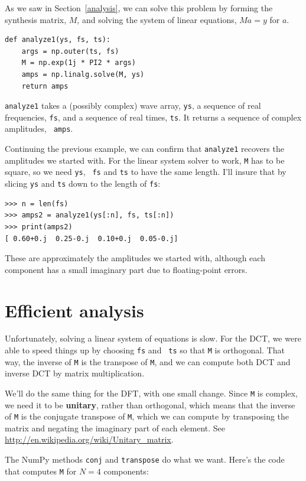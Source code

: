 \documentclass[12pt]{book}
\begin{document}
As we saw in Section~\ref{analysis}, we can solve this problem by forming
the synthesis matrix, $M$, and solving the system of linear
equations, $M a = y$ for $a$.

\begin{verbatim}
def analyze1(ys, fs, ts):
    args = np.outer(ts, fs)
    M = np.exp(1j * PI2 * args)
    amps = np.linalg.solve(M, ys)
    return amps
\end{verbatim}

{\tt analyze1} takes a (possibly complex) wave array, {\tt ys}, a
sequence of real frequencies, {\tt fs}, and a sequence of real
times, {\tt ts}.  It returns a sequence of complex amplitudes, {\tt
  amps}.

Continuing the previous example, we can confirm that {\tt analyze1}
recovers the amplitudes we started with.  For the linear system
solver to work, {\tt M} has to be square, so we need {\tt ys}, {\tt
  fs} and {\tt ts} to have the same length.  I'll insure that by
slicing {\tt ys} and {\tt ts} down to the length of {\tt fs}:

\begin{verbatim}
>>> n = len(fs)
>>> amps2 = analyze1(ys[:n], fs, ts[:n])
>>> print(amps2)
[ 0.60+0.j  0.25-0.j  0.10+0.j  0.05-0.j]
\end{verbatim}

These are approximately the amplitudes we started with, although
each component has a small imaginary part due to
floating-point errors.


\section{Efficient analysis}

Unfortunately, solving a linear system of equations is slow.  For the
DCT, we were able to speed things up by choosing {\tt fs} and {\tt
  ts} so that {\tt M} is orthogonal.  That way, the inverse of {\tt M}
is the transpose of {\tt M}, and we can compute both DCT and inverse
DCT by matrix multiplication.

We'll do the same thing for the DFT, with one small change.
Since {\tt M} is complex, we need it to be {\bf unitary}, rather
than orthogonal, which means that the inverse of {\tt M} is
the conjugate transpose of {\tt M}, which we can compute by
transposing the matrix and negating the imaginary part of each
element.  See \url{http://en.wikipedia.org/wiki/Unitary_matrix}. 

The NumPy methods {\tt conj} and {\tt transpose} do what we
want.  Here's the code that computes {\tt M} for $N=4$ components:
\end{document}
